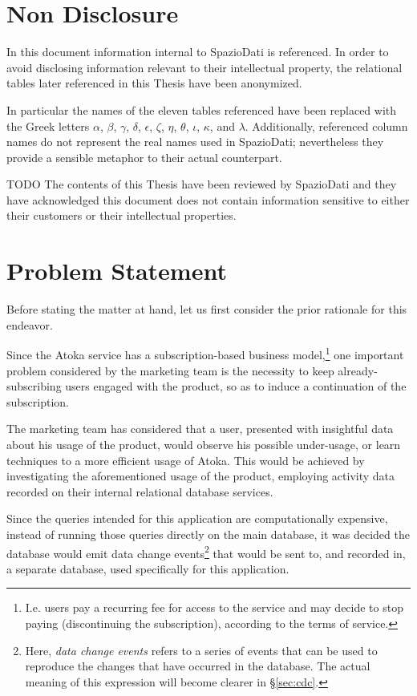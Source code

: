 \section{Non Disclosure}
\label{sec:non-disclosure}

In this document information internal to SpazioDati is referenced.
In order to avoid disclosing information relevant to their intellectual property, the relational tables later referenced in this Thesis have been anonymized.

In particular the names of the eleven tables referenced have been replaced with the Greek letters $\alpha$, $\beta$, $\gamma$, $\delta$, $\epsilon$, $\zeta$, $\eta$, $\theta$, $\iota$, $\kappa$, and $\lambda$.
Additionally, referenced column names do not represent the real names used in SpazioDati; nevertheless they provide a sensible metaphor to their actual counterpart. 

TODO
The contents of this Thesis have been reviewed by SpazioDati and they have acknowledged this document does not contain information sensitive to either their customers or their intellectual properties.


\section{Problem Statement}
\label{sec:problem-statement}

Before stating the matter at hand, let us first consider the prior rationale for this endeavor.

Since the Atoka service has a subscription-based business model,\footnote{%
I.e. users pay a recurring fee for access to the service and may decide to stop paying (discontinuing the subscription), according to the terms of service.
} one important problem considered by the marketing team is the necessity to keep already-subscribing users engaged with the product, so as to induce a continuation of the subscription.

The marketing team has considered that a user, presented with insightful data about his usage of the product, would observe his possible under-usage, or learn techniques to a more efficient usage of Atoka.
This would be achieved by investigating the aforementioned usage of the product, employing activity data recorded on their internal relational database services.

Since the queries intended for this application are computationally expensive, instead of running those queries directly on the main database, it was decided the database would emit data change events\footnote{%
Here, \emph{data change events} refers to a series of events that can be used to reproduce the changes that have occurred in the database.
The actual meaning of this expression will become clearer in \S \ref{sec:cdc}.
} that would be sent to, and recorded in, a separate database, used specifically for this application.

